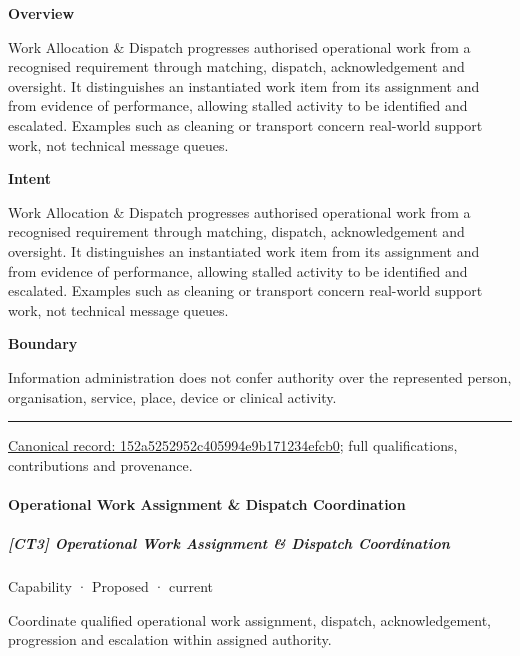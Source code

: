 \textbf{Overview}



Work Allocation \& Dispatch progresses authorised operational work from a recognised requirement through matching, dispatch, acknowledgement and oversight. It distinguishes an instantiated work item from its assignment and from evidence of performance, allowing stalled activity to be identified and escalated. Examples such as cleaning or transport concern real-world support work, not technical message queues.



\textbf{Intent}



Work Allocation \& Dispatch progresses authorised operational work from a recognised requirement through matching, dispatch, acknowledgement and oversight. It distinguishes an instantiated work item from its assignment and from evidence of performance, allowing stalled activity to be identified and escalated. Examples such as cleaning or transport concern real-world support work, not technical message queues.



\textbf{Boundary}



Information administration does not confer authority over the represented person, organisation, service, place, device or clinical activity.



\medskip\hrule\medskip

{\footnotesize \href{../../../../continuum/strategy/capability/152a5252952c405994e9b171234efcb0.md}{Canonical record: 152a5252952c405994e9b171234efcb0}; full qualifications, contributions and provenance.}\par
\paragraph{Operational Work Assignment \& Dispatch Coordination}

\subparagraph{[CT3] Operational Work Assignment \& Dispatch Coordination}

\label{element:3b58935cfa974176989c3c75d76a00fe}
{\small Capability · Proposed · current}\par

Coordinate qualified operational work assignment, dispatch, acknowledgement, progression and escalation within assigned authority.



